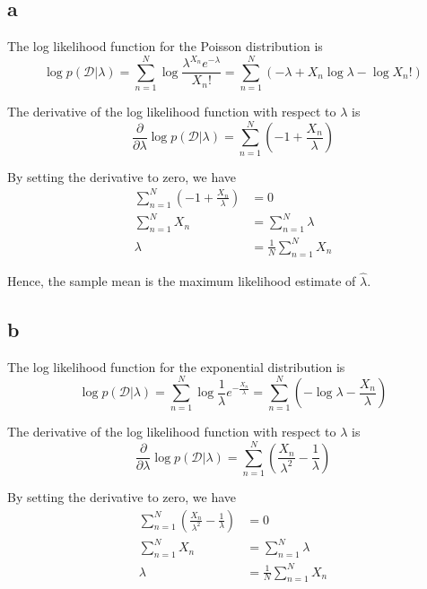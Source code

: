 \documentclass[a4paper,12pt]{article}
\newcommand{\pard}[2]{\frac{\partial #1}{\partial #2}}
\begin{document}
\subsection*{a}

The log likelihood function for the Poisson distribution is
\begin{equation*}
	\log p(\mathcal{D} | \lambda) = \sum_{n=1}^{N} \log \frac{\lambda^{X_n} e^{-\lambda}}{X_n!} = \sum_{n=1}^{N} (-\lambda + X_n \log \lambda - \log X_n!)
\end{equation*}

The derivative of the log likelihood function with respect to $\lambda$ is
\begin{equation*}
	\pard{}{\lambda} \log p(\mathcal{D} | \lambda) = \sum_{n=1}^{N} (-1 + \frac{X_n}{\lambda})
\end{equation*}

By setting the derivative to zero, we have
\begin{align*}
	\sum_{n=1}^{N} (-1 + \frac{X_n}{\lambda}) &= 0 \\
	\sum_{n=1}^{N} X_n &= \sum_{n=1}^{N} \lambda \\
	\lambda &= \frac{1}{N} \sum_{n=1}^{N} X_n
\end{align*}

Hence, the sample mean is the maximum likelihood estimate of $\hat{\lambda}$.

\subsection*{b}

The log likelihood function for the exponential distribution is
\begin{equation*}
	\log p(\mathcal{D} | \lambda) = \sum_{n=1}^{N} \log \frac{1}{\lambda} e^{-\frac{X_n}{\lambda}} = \sum_{n=1}^{N} (-\log \lambda - \frac{X_n}{\lambda})
\end{equation*}

The derivative of the log likelihood function with respect to $\lambda$ is
\begin{equation*}
	\pard{}{\lambda} \log p(\mathcal{D} | \lambda) = \sum_{n=1}^{N} (\frac{X_n}{\lambda^2} - \frac{1}{\lambda})
\end{equation*}

By setting the derivative to zero, we have
\begin{align*}
	\sum_{n=1}^{N} (\frac{X_n}{\lambda^2} - \frac{1}{\lambda}) &= 0 \\
	\sum_{n=1}^{N} X_n &= \sum_{n=1}^{N} \lambda \\
	\lambda &= \frac{1}{N} \sum_{n=1}^{N} X_n
\end{align*}
\end{document}
